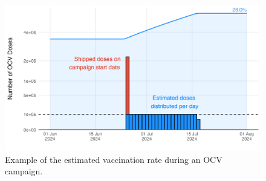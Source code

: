 \documentclass[
]{book}
\begin{document}
\begin{figure}

{\centering \includegraphics[width=1\linewidth]{figures/vaccination_example_ZMB} 

}

\caption{Example of the estimated vaccination rate during an OCV campaign.}\label{fig:vaccination-example}
\end{figure}
\end{document}
